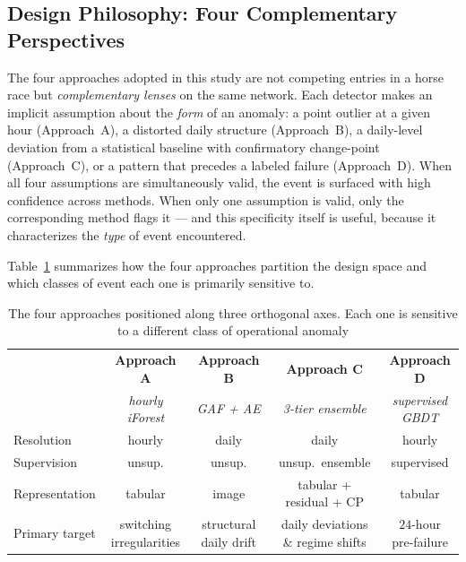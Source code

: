 \documentclass{article}
\begin{document}
\subsection{Design Philosophy: Four Complementary Perspectives}
\label{subsec:design}

The four approaches adopted in this study are not competing entries in a horse race but \emph{complementary lenses} on the same network. Each detector makes an implicit assumption about the \emph{form} of an anomaly: a point outlier at a given hour (Approach~A), a distorted daily structure (Approach~B), a daily-level deviation from a statistical baseline with confirmatory change-point (Approach~C), or a pattern that precedes a labeled failure (Approach~D). When all four assumptions are simultaneously valid, the event is surfaced with high confidence across methods. When only one assumption is valid, only the corresponding method flags it --- and this specificity itself is useful, because it characterizes the \emph{type} of event encountered.

Table~\ref{tab:four_perspectives} summarizes how the four approaches partition the design space and which classes of event each one is primarily sensitive to.

\begin{table}[H]
\centering
\caption{The four approaches positioned along three orthogonal axes. Each one is sensitive to a different class of operational anomaly}
\label{tab:four_perspectives}
\small
\begin{tabular}{lcccc}
\toprule
& \textbf{Approach A} & \textbf{Approach B} & \textbf{Approach C} & \textbf{Approach D}\\
& \emph{hourly iForest} & \emph{GAF + AE} & \emph{3-tier ensemble} & \emph{supervised GBDT}\\
\midrule
Resolution     & hourly  & daily   & daily   & hourly\\
Supervision    & unsup.  & unsup.  & unsup.\ ensemble & supervised\\
Representation & tabular & image   & tabular + residual + CP & tabular\\
Primary target & switching irregularities & structural daily drift & daily deviations \& regime shifts & $24$-hour pre-failure\\
\bottomrule
\end{tabular}
\end{table}
\end{document}
